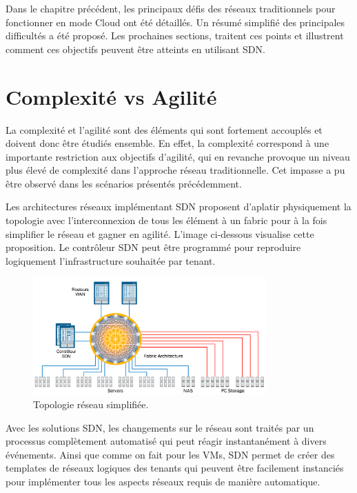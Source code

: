 Dans le chapitre précédent, les principaux défis des réseaux traditionnels pour fonctionner en mode Cloud ont été détaillés. Un résumé simplifié des principales difficultés a été proposé. Les prochaines sections, traitent ces points et illustrent comment ces objectifs peuvent être atteints en utilisant SDN.


\section{Complexité vs Agilité}

La complexité et l'agilité sont des éléments qui sont fortement accouplés et doivent donc être étudiés ensemble. En effet, la complexité correspond à une importante restriction aux objectifs d'agilité, qui en revanche provoque un niveau plus élevé de complexité dans l'approche réseau traditionnelle. Cet impasse a pu être observé dans les scénarios présentés précédemment. 

Les architectures réseaux implémentant SDN proposent d'aplatir physiquement la topologie avec l'interconnexion de tous les élément à un \gls{fabric} pour à la fois simplifier le réseau et gagner en agilité. L'image ci-dessous visualise cette proposition. Le contrôleur SDN peut être programmé pour reproduire logiquement l'infrastructure souhaitée par tenant. 

\begin{figure}[h]
\begin{center}
\includegraphics[width=0.8\textwidth]{images/RefArchiSDN} 
\caption{Topologie réseau simplifiée. \cite{cloudReadyNetworkJuniper}} \label{RefArchiSDN}
\end{center}
\end{figure} 

Avec les solutions SDN, les changements sur le réseau sont traités par un processus complètement automatisé qui peut réagir instantanément à divers événements. Ainsi que comme on fait pour les VMs, SDN permet de créer des templates de réseaux logiques des tenants qui peuvent être facilement instanciés pour implémenter tous les aspects réseaux requis de manière automatique. 

